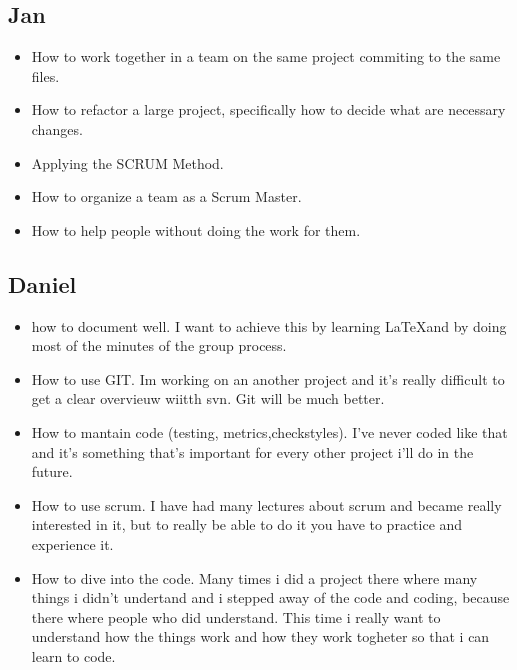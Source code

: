 \documentclass{article}
\begin{document}
\subsection*{Jan}
\begin{itemize}
	\item How to work together in a team on the same project commiting to the same files.
	\item How to refactor a large project, specifically how to decide what are necessary changes.
	\item Applying the SCRUM Method.
	\item How to organize a team as a Scrum Master.
	\item How to help people without doing the work for them.
\end{itemize}
\subsection*{Daniel} 
\begin{itemize}
	\item how to document well. I want to achieve this by learning \LaTeX  and by doing most of the  minutes of the group process. 
	\item How to use GIT. Im working on an another project and it's really difficult to get a clear overvieuw wiitth svn. Git will be much better. 
	\item How to mantain code (testing, metrics,checkstyles). I've never coded like that and it's something that's important for every other project i'll do in the future. 
	\item How to use scrum. I have had many lectures about scrum and became really interested in it, but to really be able to do it you have to practice and experience it. 
	\item How to dive into the code. Many times i did a project there where many things i didn't undertand and i stepped away of the code and coding, because there where people who did understand. This time i really want to understand how the things work and how they work togheter so that i can learn to code.  
\end{itemize}
\end{document}
